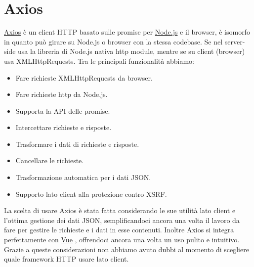 \documentclass[a4paper,12pt]{report}
\newcommand{\node}{\href{https://nodejs.org/it/}{Node.js} }
\newcommand{\vue}{\href{https://vuejs.org/}{Vue} }
\newcommand{\axios}{\href{https://axios-http.com/}{Axios} }
\begin{document}
\section{Axios}
\axios è un client HTTP basato sulle promise per \node e il browser, è isomorfo in quanto può girare su Node.js o browser con la stessa codebase. Se nel server-side usa la libreria di Node.js nativa http module, mentre se su client (browser) usa XMLHttpRequests.
Tra le principali funzionalità abbiamo:
\begin{itemize}
    \item Fare richieste XMLHttpRequests da browser.
    \item Fare richieste http da Node.js.
    \item Supporta la API delle promise.
    \item Intercettare richieste e risposte.
    \item Trasformare i dati di richieste e risposte.
    \item Cancellare le richieste.
    \item Trasformazione automatica per i dati JSON.
    \item Supporto lato client alla protezione contro XSRF.
\end{itemize}
La scelta di usare Axios è stata fatta considerando le sue utilità lato client e l'ottima gestione dei dati JSON, semplificandoci ancora una volta il lavoro da fare per gestire le richieste e i dati in esse contenuti. Inoltre Axios si integra perfettamente con \vue, offrendoci ancora una volta un uso pulito e intuitivo. Grazie a queste considerazioni non abbiamo avuto dubbi al momento di scegliere quale framework HTTP usare lato client.
\end{document}
